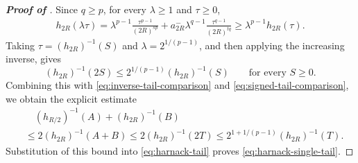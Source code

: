 \documentclass[10pt,a4paper]{amsart}
\theoremstyle{plain}
\theoremstyle{definition}
\theoremstyle{remark}
\begin{document}
\begin{proof}[\textbf{Proof of }]
Since \(q\ge p\), for every \(\lambda\ge1\) and \(\tau\ge0\),
\[
\begin{aligned}
    h_{2R}(\lambda\tau)=\lambda^{p-1}\frac{\tau^{p-1}}{(2R)^{sp}}
      +a_{2R}^-\lambda^{q-1}\frac{\tau^{q-1}}{(2R)^{tq}}
    \ge \lambda^{p-1}h_{2R}(\tau).
\end{aligned}
\]
Taking \(\tau=(h_{2R})^{-1}(S)\) and
\(\lambda=2^{1/(p-1)}\), and then applying the increasing inverse, gives
\[
    (h_{2R})^{-1}(2S)
    \le 2^{1/(p-1)}(h_{2R})^{-1}(S)
    \qquad\text{for every }S\ge0.
\]
Combining this with \eqref{eq:inverse-tail-comparison} and \eqref{eq:signed-tail-comparison}, we obtain the explicit estimate
\[
\begin{aligned}
    &\quad (h_{R/2})^{-1}(A)+(h_{2R})^{-1}(B)\\
    &\le2(h_{2R})^{-1}(A+B)
     \le2(h_{2R})^{-1}(2T)
     \le2^{1+1/(p-1)}(h_{2R})^{-1}(T).
\end{aligned}
\]
Substitution of this bound into \eqref{eq:harnack-tail} proves \eqref{eq:harnack-single-tail}. %
\end{proof}
\end{document}
